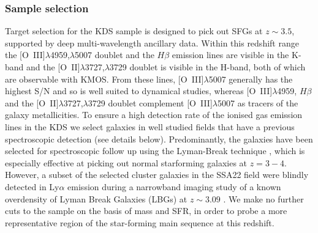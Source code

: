 \documentclass[fleqn,usenatbib]{mn2e}
\begin{document}
\subsubsection{Sample selection}\label{subsubsec:sample_selection}
Target selection for the KDS sample is designed to pick out SFGs at $z \sim 3.5$, supported by deep multi-wavelength ancillary data.
Within this redshift range the [O~{\sc III}]$\lambda$4959,$\lambda$5007 doublet and the $H\beta$ emission lines are visible in the K-band and the [O~{\sc II}]$\lambda$3727,$\lambda$3729 doublet is visible in the H-band, both of which are observable with KMOS.
From these lines, [O~{\sc III}]$\lambda$5007 generally has the highest S/N and so is well suited to dynamical studies, whereas [O~{\sc III}]$\lambda$4959, $H\beta$ and the [O~{\sc II}]$\lambda$3727,$\lambda$3729 doublet complement [O~{\sc III}]$\lambda$5007 as tracers of the galaxy metallicities. 
To ensure a high detection rate of the ionised gas emission lines in the KDS we select galaxies in well studied fields that have a previous spectroscopic detection (see details below).
Predominantly, the galaxies have been selected for spectroscopic follow up using the Lyman-Break technique \citep{Steidel1996}, which is especially effective at picking out normal starforming galaxies at $z = 3-4$.
However, a subset of the selected cluster galaxies in the SSA22 field were blindly detected in Ly$\alpha$ emission during a narrowband imaging study of a known overdensity of Lyman Break Galaxies (LBGs) at $z \sim 3.09$ \citep{Steidel2000}.
We make no further cuts to the sample on the basis of mass and SFR, in order to probe a more representative region of the star-forming main sequence at this redshift.
\end{document}
